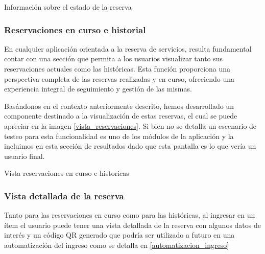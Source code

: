 \begin{images}[\label{reservacion_checkout}]{Información sobre el estado de la reserva}
\end{images}


\subsubsection{Reservaciones en curso e historial}
En cualquier aplicación orientada a la reserva de servicios, resulta fundamental contar con una sección que permita a los usuarios visualizar tanto sus reservaciones actuales como las históricas. Esta función proporciona una perspectiva completa de las reservas realizadas y en curso, ofreciendo una experiencia integral de seguimiento y gestión de las mismas.

Basándonos en el contexto anteriormente descrito, hemos desarrollado un componente destinado a la visualización de estas reservas, el cual se puede apreciar en la imagen \ref{vista_reservaciones}. Si bien no se detalla un escenario de testeo para esta funcionalidad es uno de los módulos de la aplicación y la incluimos en esta sección de resultados dado que esta pantalla es lo que vería un usuario final.

\begin{images}[\label{vista_reservaciones}]{Vista reservaciones en curso e historicas}
\end{images}

\subsubsection{Vista detallada de la reserva}
Tanto para las reservaciones en curso como para las históricas, al ingresar en un ítem el usuario puede tener una vista detallada de la reserva con algunos datos de interés y un código QR generado que podría ser utilizado a futuro en una automatización del ingreso como se detalla en \ref{automatizacion_ingreso}

